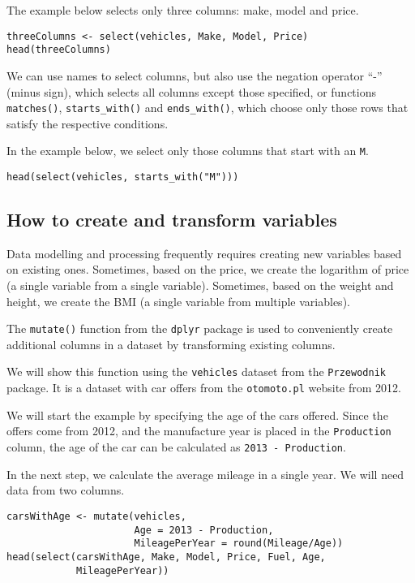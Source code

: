 \documentclass[]{book}
\theoremstyle{definition}
\theoremstyle{definition}
\theoremstyle{definition}
\theoremstyle{remark}
\begin{document}
The example below selects only three columns: make, model and price.

\begin{verbatim}
threeColumns <- select(vehicles, Make, Model, Price)
head(threeColumns)
\end{verbatim}

We can use names to select columns, but also use the negation operator
``-'' (minus sign), which selects all columns except those specified, or
functions \texttt{matches()}, \texttt{starts\_with()} and
\texttt{ends\_with()}, which choose only those rows that satisfy the
respective conditions.

In the example below, we select only those columns that start with an
\texttt{M}.

\begin{verbatim}
head(select(vehicles, starts_with("M")))
\end{verbatim}

\subsection{How to create and transform variables}\label{part_253}

Data modelling and processing frequently requires creating new variables
based on existing ones. Sometimes, based on the price, we create the
logarithm of price (a single variable from a single variable).
Sometimes, based on the weight and height, we create the BMI (a single
variable from multiple variables).

The \texttt{mutate()} function from the \texttt{dplyr} package is used
to conveniently create additional columns in a dataset by transforming
existing columns.

We will show this function using the \texttt{vehicles} dataset from the
\texttt{Przewodnik} package. It is a dataset with car offers from the
\texttt{otomoto.pl} website from 2012.

We will start the example by specifying the age of the cars offered.
Since the offers come from 2012, and the manufacture year is placed in
the \texttt{Production} column, the age of the car can be calculated as
\texttt{2013\ -\ Production}.

In the next step, we calculate the average mileage in a single year. We
will need data from two columns.

\begin{verbatim}
carsWithAge <- mutate(vehicles,
                      Age = 2013 - Production,
                      MileagePerYear = round(Mileage/Age))
head(select(carsWithAge, Make, Model, Price, Fuel, Age,
            MileagePerYear))
\end{verbatim}
\end{document}
